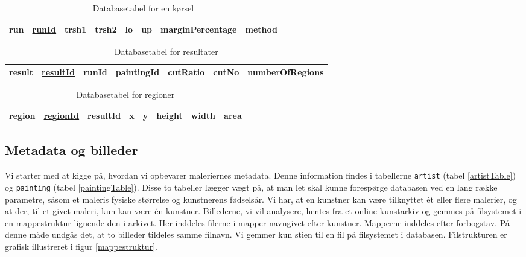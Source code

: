 {\begin{table}[!h]
    \centering
    \begin{tabular}{|l||c|c|c|c|c|c|c|}
        \hline
        \bf{run} \hspace{0.5cm} & \underline{runId} & trsh1 & trsh2 & lo & up & marginPercentage & method \\\hline
    \end{tabular}
    \caption{Databasetabel for en kørsel}
    \label{runTable}
\end{table}

\begin{table}[!h]
    \centering
    \begin{tabular}{|l||c|c|c|c|c|c|}
        \hline
        \bf{result} \hspace{0.5cm} & \underline{resultId} & runId & paintingId & cutRatio & cutNo & numberOfRegions \\\hline
    \end{tabular}
    \caption{Databasetabel for resultater}
    \label{resultTable}
\end{table}

\begin{table}[!h]
    \centering
    \begin{tabular}{|l||c|c|c|c|c|c|c|}
        \hline
        \bf{region} \hspace{0.5cm} & \underline{regionId} & resultId & x & y & height & width & area \\\hline
    \end{tabular}
    \caption{Databasetabel for regioner}
    \label{regionTable}
\end{table}

\subsection{Metadata og billeder\label{section_opbv_billeder}}
Vi starter med at kigge på, hvordan vi opbevarer maleriernes metadata.
Denne information findes i tabellerne \texttt{artist} (tabel
\ref{artistTable}) og \texttt{painting} (tabel \ref{paintingTable}).
Disse to tabeller lægger vægt på, at man let skal kunne forespørge
databasen ved en lang række parametre, såsom et maleris fysiske
størrelse og kunstnerens fødselsår. Vi har, at en kunstner kan være
tilknyttet ét eller flere malerier, og at der, til et givet maleri, kun
kan være én kunstner. Billederne, vi vil analysere, hentes fra et online
kunstarkiv og gemmes på filsystemet i en mappestruktur lignende den i
arkivet. Her inddeles filerne i mapper navngivet efter kunstner.
Mapperne inddeles efter forbogstav. På denne måde undgås det, at to
billeder tildeles samme filnavn. Vi gemmer kun stien til en fil på
filsystemet i databasen. Filstrukturen er grafisk illustreret i figur
\ref{mappestruktur}.

}
